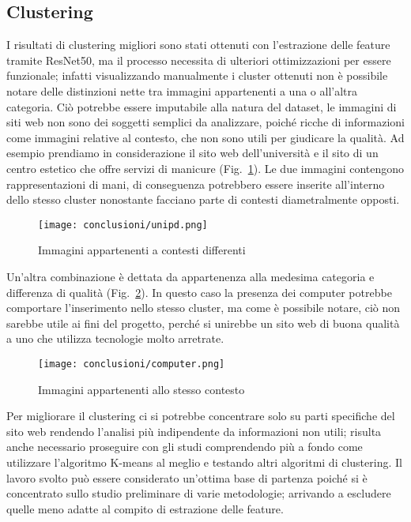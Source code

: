 \newpage 

\subsection{Clustering}
I risultati di clustering migliori sono stati ottenuti con l'estrazione delle feature tramite ResNet50, ma il processo necessita di ulteriori ottimizzazioni per essere funzionale;
infatti visualizzando manualmente i cluster ottenuti non è possibile notare delle distinzioni nette tra immagini appartenenti a una o all'altra categoria. Ciò potrebbe essere imputabile alla natura del dataset, le immagini di siti web non sono dei soggetti semplici da analizzare, poiché ricche di informazioni come immagini relative al contesto, che non sono utili per giudicare la qualità.
Ad esempio prendiamo in considerazione il sito web dell'università e il sito di un centro estetico che offre servizi di manicure (Fig.~\ref{fig:unipd-conc}).
Le due immagini contengono rappresentazioni di mani, di conseguenza potrebbero essere inserite all'interno dello stesso cluster nonostante facciano parte di contesti diametralmente opposti.
\begin{figure}[!h] 
    \centering 
    \texttt{[image: conclusioni/unipd.png]} 
    \caption{Immagini appartenenti a contesti differenti}
    \label{fig:unipd-conc}
  \end{figure}

\newpage
Un'altra combinazione è dettata da appartenenza alla medesima categoria e differenza di qualità (Fig.~\ref{fig:computer-conc}).
In questo caso la presenza dei computer potrebbe comportare l'inserimento nello stesso cluster, ma come è possibile notare, ciò non sarebbe utile ai fini del progetto, perché si unirebbe un sito web di buona qualità a uno che utilizza tecnologie molto arretrate.

\begin{figure}[!h] 
    \centering 
    \texttt{[image: conclusioni/computer.png]} 
    \caption{Immagini appartenenti allo stesso contesto}
    \label{fig:computer-conc}
  \end{figure}
Per migliorare il clustering ci si potrebbe concentrare solo su parti specifiche del sito web rendendo l'analisi più indipendente da informazioni non utili; risulta anche necessario proseguire con gli studi comprendendo più a fondo come utilizzare l'algoritmo K-means al meglio e testando altri algoritmi di clustering.
Il lavoro svolto può essere considerato un'ottima base di partenza poiché si è concentrato sullo studio preliminare di varie metodologie; arrivando a escludere quelle meno adatte al compito di estrazione delle feature.

